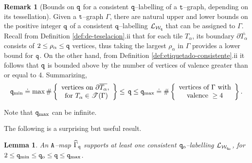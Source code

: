 \documentclass[final,3p,times]{elsarticle}
\newtheorem{lemma}[theorem]{Lemma}
\theoremstyle{definition}
\newtheorem{remark}[theorem]{Remark}
\begin{document}
\begin{remark}[Bounds on $\tt q$ for a consistent $\tt q$--labelling of a $\tt t$--graph, 
depending on its tessellation]
\label{rem:bounds-for-q}
Given a $\tt t$--graph $\Gamma$, 
there are natural upper and lower bounds on the 
positive integer $\tt q$ of a consistent $\tt q$--labelling $\mathcal{L}_{\mathcal{W}_{\tt q}}$ that can be
assigned to $\Gamma$. 
Recall from Definition \ref{def:de-teselacion}.ii that for each tile $T_\alpha$, its boundary
$\partial \overline{T_\alpha}$ consists of $2\leq \rho_\alpha \leq {\tt q}$ vertices, 
thus taking the largest $\rho_\alpha$ in $\Gamma$ provides a lower bound for $\tt q$.
On the other hand, from Definition \ref{def:etiquetado-consistente}.ii it follows that 
$\tt q$ is bounded above by the number of vertices of valence greater than or equal to 4.
Summarizing,
%
\begin{equation}
\label{cota-q-mosaicos}
{\tt q}_{\text{min}} \doteq 
\max \# \left \{ \begin{array}{c}
\text{vertices on } \partial \overline{T_\alpha},  \\ 
\text{ for }
T_\alpha \in \mathscr{T}(\Gamma)
\end{array}
\right \}
\leq  \, {\tt q} \leq 
{\tt q}_{\text{max}} \doteq
\# \left \{ \begin{array}{c}
\text{vertices of } \Gamma \text{ with}\\
\text{valence } \geq 4
\end{array}
\right\} .
\end{equation}

\noindent
Note that ${\tt q}_{\text{max}}$ can be infinite.
\end{remark}

The following is a surprising but useful result.

\begin{lemma}
\label{lem:A-mapa-admite-etiquetados}
An $\tt A$--map $\widehat{\Gamma}_{\tt q}$ supports at least one consistent 
${\tt q}_{\rm o}$--labelling $\mathcal{L}_{\mathcal{W}_{{\tt q}_{\rm o}}}$, for 
$2 \leq {\tt q}_{\text{min}} \leq {\tt q}_{\rm o} \leq {\tt q} \leq {\tt q}_{\text{max}}$.
\end{lemma}
\end{document}

